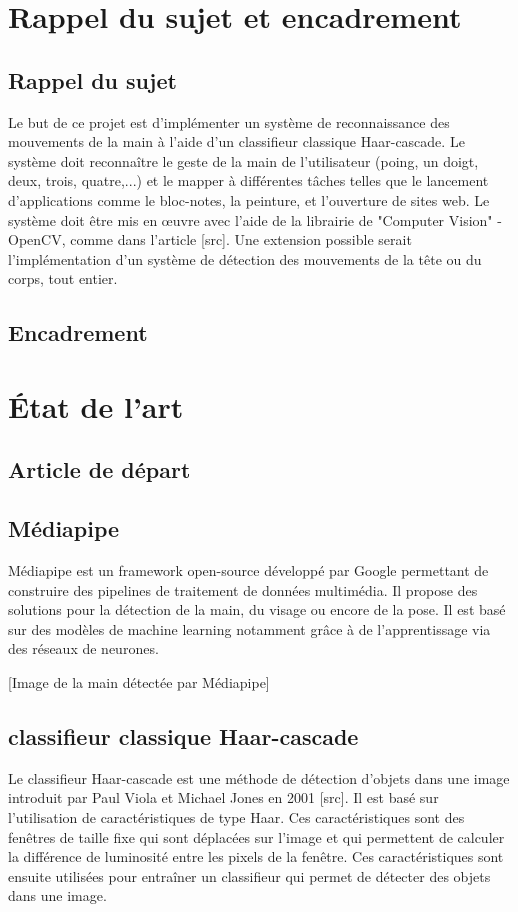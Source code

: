 \documentclass[11pt]{article}
\begin{document}
\newpage

\section{Rappel du sujet et encadrement}
\subsection{Rappel du sujet}

Le but de ce projet est d’implémenter un système de reconnaissance des mouvements de la
main à l’aide d’un classifieur classique Haar-cascade. Le système doit reconnaître le geste de
la main de l’utilisateur (poing, un doigt, deux, trois, quatre,...) et le mapper à différentes tâches
telles que le lancement d’applications comme le bloc-notes, la peinture, et l’ouverture de sites web.
Le système doit être mis en œuvre avec l’aide de la librairie de "Computer Vision" - OpenCV,
comme dans l’article [src]. Une extension possible serait l’implémentation d’un système de détection
des mouvements de la tête ou du corps, tout entier.

\subsection{Encadrement}

\newpage

\section{\'Etat de l'art}
\subsection{Article de départ}
\subsection{Médiapipe}
Médiapipe est un framework open-source développé par Google permettant de construire des pipelines de traitement de données multimédia. Il propose des solutions pour la détection de la main, du visage ou encore de la pose. Il est basé sur des modèles de machine learning notamment grâce à de l'apprentissage via des réseaux de neurones. \bigbreak

[Image de la main détectée par Médiapipe]


\subsection{classifieur classique Haar-cascade}
Le classifieur Haar-cascade est une méthode de détection d'objets dans une image introduit par Paul Viola et Michael Jones en 2001 [src]. Il est basé sur l'utilisation de caractéristiques de type Haar. Ces caractéristiques sont des fenêtres de taille fixe qui sont déplacées sur l'image et qui permettent de calculer la différence de luminosité entre les pixels de la fenêtre. Ces caractéristiques sont ensuite utilisées pour entraîner un classifieur qui permet de détecter des objets dans une image. \bigbreak
\end{document}
